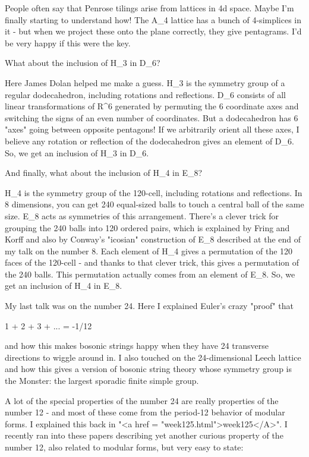 People often say that Penrose tilings arise from lattices in 4d space.  
Maybe I'm finally starting to understand how!  The A_{4} lattice has a 
bunch of 4-simplices in it - but when we project these onto the plane 
correctly, they give pentagrams.   I'd be very happy if this were
the key.

What about the inclusion of H_{3} in D_{6}?

Here James Dolan helped me make a guess.  H_{3} is the
symmetry group of a regular dodecahedron, including rotations and
reflections.  D_{6} consists of all linear transformations of
R^{6} generated by permuting the 6 coordinate axes and
switching the signs of an even number of coordinates.  But a
dodecahedron has 6 "axes" going between opposite pentagons!
If we arbitrarily orient all these axes, I believe any rotation or
reflection of the dodecahedron gives an element of D_{6}.  So,
we get an inclusion of H_{3} in D_{6}.

And finally, what about the inclusion of H_{4} in E_{8}?  

H_{4} is the symmetry group of the 120-cell, including
rotations and reflections.  In 8 dimensions, you can get 240
equal-sized balls to touch a central ball of the same size.
E_{8} acts as symmetries of this arrangement.  There's a
clever trick for grouping the 240 balls into 120 ordered pairs, which
is explained by Fring and Korff and also by Conway's "icosian"
construction of E_{8} described at the end of my talk on the
number 8.  Each element of H_{4} gives a permutation of the
120 faces of the 120-cell - and thanks to that clever trick, this
gives a permutation of the 240 balls.  This permutation actually comes
from an element of E_{8}.  So, we get an inclusion of
H_{4} in E_{8}.

My last talk was on the number 24.  Here I explained Euler's crazy
"proof" that

1 + 2 + 3 + ... = -1/12

and how this makes bosonic strings happy when they have 24 transverse
directions to wiggle around in.  I also touched on the 24-dimensional
Leech lattice and how this gives a version of bosonic string theory
whose symmetry group is the Monster: the largest sporadic finite simple group.

A lot of the special properties of the number 24 are really properties
of the number 12 - and most of these come from the period-12 behavior
of modular forms.  I explained this back in "<a href =
"week125.html">week125</A>".  I recently ran into these papers
describing yet another curious property of the number 12, also related
to modular forms, but very easy to state:

